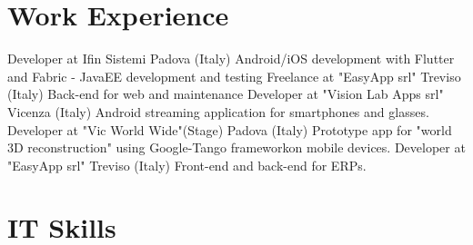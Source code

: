 \documentclass[letterpaper]{twentysecondcv} %
\begin{document}



\section{Work Experience}

\begin{twenty} %
		{Developer at Ifin Sistemi\footnotemarkA[8]} {Padova (Italy)}
		{Android/iOS development with Flutter and Fabric - JavaEE development and testing}
		{Freelance at "EasyApp srl"\footnotemarkA[7]} {Treviso (Italy)}
		{Back-end for web and maintenance}
		{Developer at "Vision Lab Apps srl"\footnotemarkA[4]}	{Vicenza (Italy)}
		{Android streaming application for smartphones and glasses.}
		{Developer at "Vic World Wide"\footnotemarkA[5] (Stage)}	{Padova (Italy)}
		{Prototype app for "world 3D reconstruction" using Google-Tango framework\footnotemarkA[6] on mobile devices.}
		{Developer at "EasyApp srl"\footnotemarkA[7]}	{Treviso (Italy)}
		{Front-end and back-end for ERPs.}
\end{twenty}




\section{IT Skills}
\end{document}
